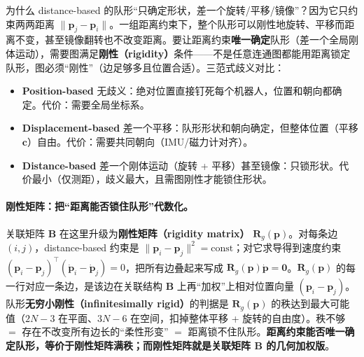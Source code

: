 为什么 distance-based 的队形“只确定形状，差一个旋转/平移/镜像”？因为它只约束两两距离 $\|\mathbf{p}_j-\mathbf{p}_i\|$。一组距离约束下，整个队形可以刚性地旋转、平移而距离不变，甚至镜像翻转也不改变距离。要让距离约束\textbf{唯一确定}队形（差一个全局刚体运动），需要图满足\textbf{刚性（rigidity）}条件——不是任意连通图都能用距离锁定队形，图必须“刚性”（边足够多且位置合适）。三范式歧义对比：
\begin{itemize}
  \item \textbf{Position-based} 无歧义：绝对位置直接钉死每个机器人，位置和朝向都确定。代价：需要全局坐标系。
  \item \textbf{Displacement-based} 差一个平移：队形形状和朝向确定，但整体位置（平移 $\mathbf{c}$）自由。代价：需要共同朝向（IMU/磁力计对齐）。
  \item \textbf{Distance-based} 差一个刚体运动（旋转 + 平移）甚至镜像：只锁形状。代价最小（仅测距），歧义最大，且需图刚性才能锁住形状。
\end{itemize}

\paragraph{刚性矩阵：把“距离能否锁住队形”代数化。}
关联矩阵 $\mathbf{B}$ 在这里升级为\textbf{刚性矩阵（rigidity matrix）} $\mathbf{R}_g(\mathbf{p})$。对每条边 $(i,j)$，distance-based 约束是 $\|\mathbf{p}_i-\mathbf{p}_j\|^2=\text{const}$；对它求导得到速度约束 $(\mathbf{p}_i-\mathbf{p}_j)^\top(\dot{\mathbf{p}}_i-\dot{\mathbf{p}}_j)=0$，把所有边叠起来写成 $\mathbf{R}_g(\mathbf{p})\dot{\mathbf{p}}=\mathbf{0}$。$\mathbf{R}_g(\mathbf{p})$ 的每一行对应一条边，是该边在关联结构 $\mathbf{B}$ 上再“加权”上相对位置向量 $(\mathbf{p}_i-\mathbf{p}_j)$。队形\textbf{无穷小刚性（infinitesimally rigid）}的判据是 $\mathbf{R}_g(\mathbf{p})$ 的秩达到最大可能值（$2N-3$ 在平面、$3N-6$ 在空间，扣掉整体平移 + 旋转的自由度）。秩不够 $=$ 存在不改变所有边长的“柔性形变” $=$ 距离锁不住队形。\textbf{距离约束能否唯一确定队形，等价于刚性矩阵满秩；而刚性矩阵就是关联矩阵 $\mathbf{B}$ 的几何加权版}。


